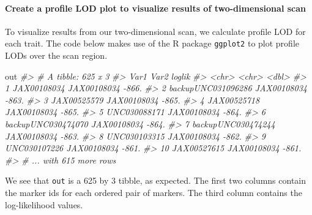 \documentclass[oneside]{book}\usepackage[]{graphicx}\usepackage[]{color}
\newenvironment{Shaded}{\begin{snugshade}}{\end{snugshade}}
\newcommand{\CommentTok}[1]{\textcolor[rgb]{0.56,0.35,0.01}{\textit{#1}}}
\newcommand{\DataTypeTok}[1]{\textcolor[rgb]{0.13,0.29,0.53}{#1}}
\newcommand{\FloatTok}[1]{\textcolor[rgb]{0.00,0.00,0.81}{#1}}
\newcommand{\KeywordTok}[1]{\textcolor[rgb]{0.13,0.29,0.53}{\textbf{#1}}}
\newcommand{\NormalTok}[1]{#1}
\newcommand{\OperatorTok}[1]{\textcolor[rgb]{0.81,0.36,0.00}{\textbf{#1}}}
\newcommand{\StringTok}[1]{\textcolor[rgb]{0.31,0.60,0.02}{#1}}
\begin{document}
\hypertarget{create-a-profile-lod-plot-to-visualize-results-of-two-dimensional-scan}{%
\paragraph{Create a profile LOD plot to visualize results of
two-dimensional
scan}\label{create-a-profile-lod-plot-to-visualize-results-of-two-dimensional-scan}}

To visualize results from our two-dimensional scan, we calculate profile
LOD for each trait. The code below makes use of the R package
\texttt{ggplot2} to plot profile LODs over the scan region.

\begin{Shaded}
\begin{Highlighting}[]
\NormalTok{out}
\CommentTok{#> # A tibble: 625 x 3}
\CommentTok{#>    Var1               Var2        loglik}
\CommentTok{#>    <chr>              <chr>        <dbl>}
\CommentTok{#>  1 JAX00108034        JAX00108034  -866.}
\CommentTok{#>  2 backupUNC031096286 JAX00108034  -863.}
\CommentTok{#>  3 JAX00525579        JAX00108034  -865.}
\CommentTok{#>  4 JAX00525718        JAX00108034  -865.}
\CommentTok{#>  5 UNC030088171       JAX00108034  -864.}
\CommentTok{#>  6 backupUNC030474070 JAX00108034  -864.}
\CommentTok{#>  7 backupUNC030474244 JAX00108034  -863.}
\CommentTok{#>  8 UNC030103315       JAX00108034  -862.}
\CommentTok{#>  9 UNC030107226       JAX00108034  -861.}
\CommentTok{#> 10 JAX00527615        JAX00108034  -861.}
\CommentTok{#> # ... with 615 more rows}
\end{Highlighting}
\end{Shaded}

We see that \texttt{out} is a 625 by 3 tibble, as expected. The first
two columns contain the marker ids for each ordered pair of markers. The
third column contains the log-likelihood values.

\begin{Shaded}
\end{Shaded}
\end{document}
